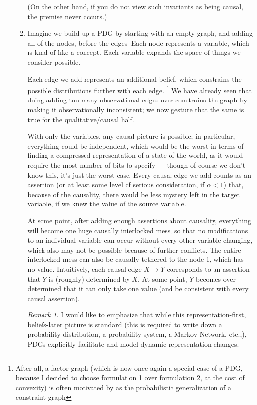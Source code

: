 \documentclass{article}
\theoremstyle{plain}
\theoremstyle{definition}
\theoremstyle{remark}
\newtheorem*{remark}{Remark}
\begin{document}
\begin{enumerate}[itemsep=1em]
\begin{enumerate}[itemsep=1em]
	(On the other hand, if you do not view such invariants as being causal, the premise never occurs.) 
		
	\item Imagine we build up a PDG by starting with an empty graph, and adding all of the nodes, before the edges. Each node represents a variable, which is kind of like a concept. Each variable expands the space of things we consider possible. 
	
	Each edge we add represents an additional belief, which constrains the possible distributions further with each edge.%
		\footnote{After all, a factor graph (which is now once again a special case of a PDG, because I decided to choose formulation 1 over formulation 2, at the cost of convexity) is often motivated by as the probabilistic generalization of a constraint graph}
	We have already seen that doing adding too many observational edges over-constrains the graph by making it observationally inconsistent; we now gesture that the same is true for the qualitative/causal half.

	With only the variables, any causal picture is possible; in particular, everything could be independent, which would be the worst in terms of finding a compressed representation of a state of the world, as it would require the most number of bits to specify --- though of course we don't know this, it's just the worst case.  Every causal edge we add counts as an assertion (or at least some level of serious consideration, if $\alpha < 1$) that, because of the causality, there would be less mystery left in the target variable, if we knew the value of the source variable.
	 
	At some point, after adding enough assertions about causality, everything will become one huge causally interlocked mess, so that no modifications to an individual variable can occur without every other variable changing, which also may not be possible because of further conflicts. The entire interlocked mess can also be causally tethered to the node 1, which has no value. Intuitively, each causal edge $X \to Y$ corresponds to an assertion that $Y$ is (roughly) determined by $X$. At some point, $Y$ becomes over-determined that it can only take one value (and be consistent with every causal assertion).
	
	\begin{remark}
	I would like to emphasize that while this representation-first, beliefs-later picture is standard (this is 	required to write down a probability distribution, a probability system, a Markov Network, etc.,), PDGs explicitly facilitate and model dynamic representation changes. 
	\end{remark}
	

\end{enumerate}
\end{enumerate}
\end{document}
